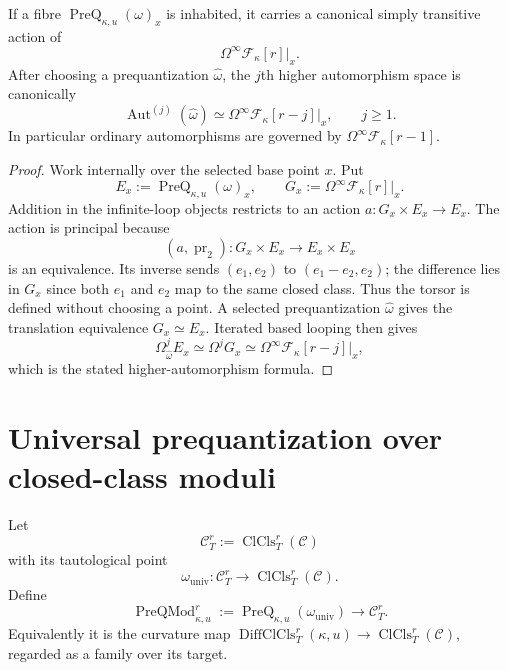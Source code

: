 \begin{theorem}
\label{thm:prequantum-flat-torsor}
If a fibre $\operatorname{PreQ}_{\kappa,u}(\omega)_x$ is inhabited, it carries a
canonical simply transitive action of
\[
\boxed{
\Omega^\infty\mathscr F_\kappa[r]|_x.
}
\]
After choosing a prequantization $\widehat\omega$, the $j$th higher automorphism
space is canonically
\[
\boxed{
\operatorname{Aut}^{(j)}(\widehat\omega)
\simeq
\Omega^\infty\mathscr F_\kappa[r-j]|_x,
\qquad j\ge1.
}
\]
In particular ordinary automorphisms are governed by
$\Omega^\infty\mathscr F_\kappa[r-1]$.
\end{theorem}

\begin{proof}
Work internally over the selected base point $x$.  Put
\[
E_x:=
\operatorname{PreQ}_{\kappa,u}(\omega)_x,
\qquad
G_x:=\Omega^\infty\mathscr F_\kappa[r]|_x.
\]
Addition in the infinite-loop objects restricts to an action
$a:G_x\times E_x\to E_x$.  The action is principal because
\[
(a,\operatorname{pr}_2):
G_x\times E_x\longrightarrow E_x\times E_x
\]
is an equivalence.  Its inverse sends $(e_1,e_2)$ to
$(e_1-e_2,e_2)$; the difference lies in $G_x$ since both $e_1$ and $e_2$
map to the same closed class.  Thus the torsor is defined without choosing a
point.  A selected prequantization $\widehat\omega$ gives the translation
equivalence $G_x\simeq E_x$.  Iterated based looping then gives
\[
\Omega^j_{\widehat\omega}E_x
\simeq
\Omega^jG_x
\simeq
\Omega^\infty\mathscr F_\kappa[r-j]|_x,
\]
which is the stated higher-automorphism formula.
\end{proof}

\section{Universal prequantization over closed-class moduli}
\label{sec:prequantum-universal-prequantization}

\begin{construction}
\label{constr:prequantum-universal-prequantization-family}
Let
\[
\mathscr C_T^r:=\operatorname{ClCls}_T^r(\mathscr C)
\]
with its tautological point
\[
\omega_{\mathrm{univ}}:\mathscr C_T^r
\longrightarrow
\operatorname{ClCls}_T^r(\mathscr C).
\]
Define
\[
\boxed{
\operatorname{PreQMod}_{\kappa,u}^r
:=
\operatorname{PreQ}_{\kappa,u}(\omega_{\mathrm{univ}})
\longrightarrow
\mathscr C_T^r.
}
\]
Equivalently it is the curvature map
$\operatorname{DiffClCls}_T^r(\kappa,u)\to\operatorname{ClCls}_T^r(\mathscr C)$,
regarded as a family over its target.
\end{construction}

